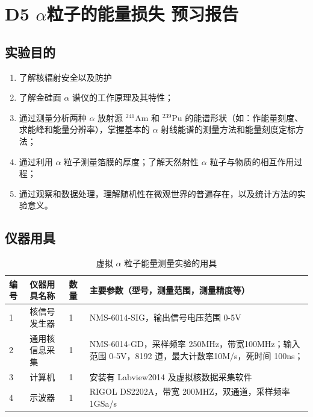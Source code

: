\documentclass[dvipsnames, svgnames,a4paper,11pt]{article}
\begin{document}
\clearpage
\tableofcontents
\clearpage

\setcounter{section}{0}
\section{D5 \quad $\alpha$粒子的能量损失 \quad\heiti 预习报告}
	
\subsection{实验目的}
\begin{enumerate}
	\item 了解核辐射安全以及防护
	\item 了解金硅面 $\alpha$ 谱仪的工作原理及其特性；
	\item 通过测量分析两种 $\alpha$ 放射源 $^{241}\mathrm{Am}$ 和 $^{239}\mathrm{Pu}$ 的能谱形状（如：作能量刻度、求能峰和能量分辨率），掌握基本的 $\alpha$ 射线能谱的测量方法和能量刻度定标方法；
	\item 通过利用 $\alpha$ 粒子测量箔膜的厚度；了解天然射性 $\alpha$ 粒子与物质的相互作用过程；
	\item 通过观察和数据处理，理解随机性在微观世界的普遍存在，以及统计方法的实验意义。
	
\end{enumerate}

\subsection{仪器用具}

\begin{table}[htbp]
	\centering
	\renewcommand\arraystretch{1.6}
	\caption{虚拟 $\alpha$ 粒子能量测量实验的用具}
	\begin{tabular}{p{}|p{}|p{}|p{}}
		\hline
		编号& 仪器用具名称 & 数量 &  主要参数（型号，测量范围，测量精度等） \\
		\hline
		1	&	核信号发生器 	& 1 & NMS-6014-SIG，输出信号电压范围 0-5V	\\

		2	&	通用核信息采集 	& 1 & NMS-6014-GD，采样频率 250MHz，带宽100MHz；输入范围 0-5V，8192 道，最大计数率10M/s，死时间 100ns；	 \\
		
		3	&	计算机 & 1 & 安装有 Labview2014 及虚拟核数据采集软件	 	\\
		
		4	&	示波器	& 1 &  RIGOL DS2202A，带宽 200MHZ，双通道，采样频率 1GSa/s	\\
		
		\hline
	\end{tabular}
	\label{tbl:虚拟alpha粒子能量测量实验的用具}
\end{table}
\end{document}
